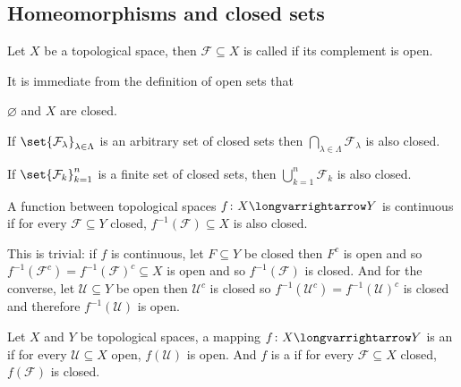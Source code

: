 \documentclass[10pt]{article}
\def\mU{\mathcal{U}}
\def\mF{\mathcal{F}}
\def\longto{\longvarrightarrow}
\begin{document}


\bigskip

\subsection{Homeomorphisms and closed sets}

\begin{defn*}

    Let $X$ be a topological space, then $\mF\subseteq X$ is called  if its complement is open.

\end{defn*}

It is immediate from the definition of open sets that
\benum
    \item $\varnothing$ and $X$ are closed.
    \item If $\set{\mF_\lambda}_{\lambda\in\Lambda}$ is an arbitrary set of closed sets then $\bigcap_{\lambda\in\Lambda}\mF_\lambda$ is also closed.
    \item If $\set{\mF_k}_{k=1}^n$ is a finite set of closed sets, then $\bigcup_{k=1}^n \mF_k$ is also closed.
\eenum

\begin{prop*}

    A function between topological spaces $f\colon X\longto Y$ is continuous if for every $\mF\subseteq Y$ closed, $f^{-1}(\mF)\subseteq X$ is also closed.

\end{prop*}

This is trivial: if $f$ is continuous, let $F\subseteq Y$ be closed then $F^c$ is open and so $f^{-1}(\mF^c)=f^{-1}(\mF)^c\subseteq X$ is open and so $f^{-1}(\mF)$ is closed.
And for the converse, let $\mU\subseteq Y$ be open then $\mU^c$ is closed so $f^{-1}(\mU^c)=f^{-1}(\mU)^c$ is closed and therefore $f^{-1}(\mU)$ is open.

\begin{defn*}

    Let $X$ and $Y$ be topological spaces, a mapping $f\colon X\longto Y$ is an  if for every $\mU\subseteq X$ open, $f(\mU)$ is open.
    And $f$ is a  if for every $\mF\subseteq X$ closed, $f(\mF)$ is closed.

\end{defn*}
\end{document}
